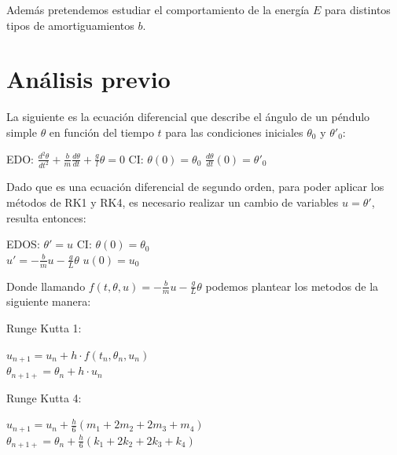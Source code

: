 \documentclass[titlepage,a4paper]{article}
\begin{document}
Además pretendemos estudiar el comportamiento de la energía $E$ para distintos tipos de amortiguamientos $b$.


\section{Análisis previo}
La siguiente es la ecuación diferencial que describe el ángulo de un péndulo simple $\theta$ en función del tiempo $t$ para las condiciones iniciales $\theta_0$ y $\theta'_0$:

\begin{center}
    EDO: \hspace{2mm} $\frac{d^2\theta}{dt^2}+\frac{b}{m}\frac{d\theta}{dt} +\frac{g}{l}\theta = 0$ \hspace{5mm} CI: \hspace{2mm} $\theta(0) = \theta_0$ \hspace{3mm} $\frac{d\theta}{dt}(0) = \theta'_0$
\end{center}

Dado que es una ecuación diferencial de segundo orden, para poder aplicar los métodos de RK1 y RK4, es necesario realizar un cambio de variables $u = \theta'$, resulta entonces:

\begin{center}
    EDOS: \hspace{2mm} $\theta' = u$ \hspace{15mm} CI: \hspace{2mm} $\theta(0) = \theta_0$ \\
    \hspace{15mm}$u' = -\frac{b}{m}u-\frac{g}{L}\theta$ \hspace{10mm} $u(0) = u_0$
\end{center}

Donde llamando $f(t, \theta, u) = -\frac{b}{m}u-\frac{g}{L}\theta$ podemos plantear los metodos de la siguiente manera:
    
Runge Kutta 1:

\begin{center}
    $u_{n+1} = u_{n} + h \cdot f(t_n, \theta_n, u_n)$\\
    $\theta_{n+1+} = \theta_{n} + h \cdot u_n$
\end{center}

Runge Kutta 4:

\begin{center}
    $u_{n+1} = u_{n} + \frac{h}{6} ( m_1 + 2m_2 + 2m_3 + m_4)$\\
    $\theta_{n+1+} = \theta_{n} + \frac{h}{6}  ( k_1 + 2k_2 + 2k_3 + k_4)$
\end{center}
\end{document}
